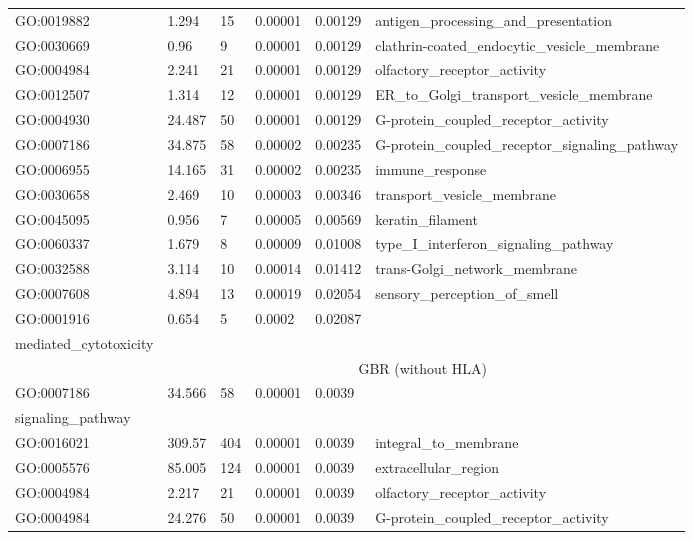 \begin{refsection}
\begin{otherlanguage}{english}
\begin{scriptsize}
\begin{longtable}{llllll}
GO:0019882 & 1.294 & 15 & 0.00001 & 0.00129 & antigen\_processing\_and\_presentation \\
GO:0030669 & 0.96 & 9 & 0.00001 & 0.00129 & clathrin-coated\_endocytic\_vesicle\_membrane \\
GO:0004984 & 2.241 & 21 & 0.00001 & 0.00129 & olfactory\_receptor\_activity \\
GO:0012507 & 1.314 & 12 & 0.00001 & 0.00129 & ER\_to\_Golgi\_transport\_vesicle\_membrane \\
GO:0004930 & 24.487 & 50 & 0.00001 & 0.00129 & G-protein\_coupled\_receptor\_activity \\
GO:0007186 & 34.875 & 58 & 0.00002 & 0.00235 & G-protein\_coupled\_receptor\_signaling\_pathway \\
GO:0006955 & 14.165 & 31 & 0.00002 & 0.00235 & immune\_response \\
GO:0030658 & 2.469 & 10 & 0.00003 & 0.00346 & transport\_vesicle\_membrane \\
GO:0045095 & 0.956 & 7 & 0.00005 & 0.00569 & keratin\_filament \\
GO:0060337 & 1.679 & 8 & 0.00009 & 0.01008 & type\_I\_interferon\_signaling\_pathway \\
GO:0032588 & 3.114 & 10 & 0.00014 & 0.01412 & trans-Golgi\_network\_membrane \\
GO:0007608 & 4.894 & 13 & 0.00019 & 0.02054 & sensory\_perception\_of\_smell \\
GO:0001916 & 0.654 & 5 & 0.0002 & 0.02087 & \begin{tabular}[c]{@{}l@{}}positive\_regulation\_of\_T\_cell\_ \\ mediated\_cytotoxicity\end{tabular} \\
 & \multicolumn{5}{c}{\cellcolor[HTML]{EFEFEF}GBR (without HLA)} \\
GO:0007186 & 34.566 & 58 & 0.00001 & 0.0039 & \begin{tabular}[c]{@{}l@{}}G-protein\_coupled\_receptor\_ \\ signaling\_pathway\end{tabular} \\
GO:0016021 & 309.57 & 404 & 0.00001 & 0.0039 & integral\_to\_membrane \\
GO:0005576 & 85.005 & 124 & 0.00001 & 0.0039 & extracellular\_region \\
GO:0004984 & 2.217 & 21 & 0.00001 & 0.0039 & olfactory\_receptor\_activity \\
GO:0004984 & 24.276 & 50 & 0.00001 & 0.0039 & G-protein\_coupled\_receptor\_activity \\

\end{longtable}
\end{scriptsize}
\end{otherlanguage}
\end{refsection}
